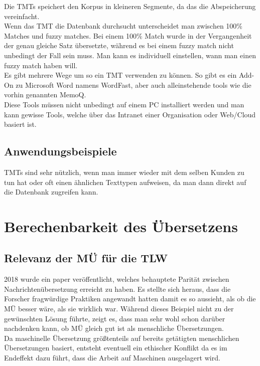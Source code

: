\documentclass{article}
\begin{document}
	Die TMTs speichert den Korpus in kleineren Segmente, da das die Abspeicherung vereinfacht. \\
	Wenn das TMT die Datenbank durchsucht unterscheidet man zwischen 100\% Matches und fuzzy matches. Bei einem 100\% Match wurde in der Vergangenheit der genau gleiche Satz übersetzte, während es bei einem fuzzy match nicht unbedingt der Fall sein muss. Man kann es individuell einstellen, wann man einen fuzzy match haben will. \\
	Es gibt mehrere Wege um so ein TMT verwenden zu können. So gibt es ein Add-On zu Microsoft Word namens WordFast, aber auch alleinstehende tools wie die vorhin genannten MemoQ. \\
	Diese Tools müssen nicht unbedingt auf einem PC installiert werden und man kann gewisse Tools, welche über das Intranet einer Organisation oder Web/Cloud basiert ist. \\
	\subsection{Anwendungsbeispiele}
	TMTs sind sehr nützlich, wenn man immer wieder mit dem selben Kunden zu tun hat oder oft einen ähnlichen Texttypen aufweisen, da man dann direkt auf die Datenbank zugreifen kann. \\

	\section{Berechenbarkeit des Übersetzens}
	\subsection{Relevanz der MÜ für die TLW}
	2018 wurde ein paper veröffentlicht, welches behauptete Parität zwischen Nachrichtenübersetzung erreicht zu haben. Es stellte sich heraus, dass die Forscher fragwürdige Praktiken angewandt hatten damit es so aussieht, als ob die MÜ besser wäre, als sie wirklich war. Während dieses Beispiel nicht zu der gewünschten Lösung führte, zeigt es, dass man sehr wohl schon darüber nachdenken kann, ob MÜ gleich gut ist als menschliche Übersetzungen. \\
	Da maschinelle Übersetzung größtenteils auf bereits getätigten menschlichen Übersetzungen basiert, entsteht eventuell ein ethischer Konflikt da es im Endeffekt dazu führt, dass die Arbeit auf Maschinen ausgelagert wird. \\
\end{document}
